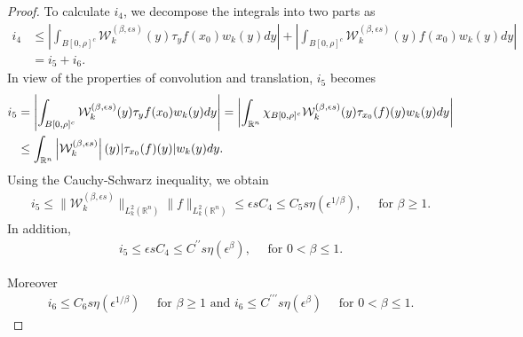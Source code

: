 \documentclass[11pt,a4paper,reqno]{amsproc}
\theoremstyle{definition}
\theoremstyle{remark}
\numberwithin{equation}{section}
\begin{document}
\begin{proof}
To calculate $i_4$, we decompose the integrals into two parts as
\begin{align*}
    i_4 &\leq \left|\int_{B[0,\rho]^c} \mathcal{W}_k^{(\beta, \epsilon s)}(y)  \tau_yf(x_0) w_k(y)dy
        \right| + \left|\int_{B[0,\rho]^c} \mathcal{W}_k^{(\beta, \epsilon s)}(y)  f(x_0) w_k(y)dy 
        \right| \\
        &= i_5+i_6.
\end{align*}
In view of the properties of convolution and translation, $i_5$ becomes
\begin{align*}
    i_5 &= \left|\int_{B[0,\rho]^c} \mathcal{W}_k^{(\beta, \epsilon s)}(y)  \tau_yf(x_0) w_k(y)dy
        \right| = \left| \int_{\mathbb{R}^n} \chi_{B[0,\rho]^c} \mathcal{W}_k^{(\beta, \epsilon s)}(y)\tau_{x_0}( f)(y)w_k(y)dy \right| \notag \\
        & \leq  \int_{\mathbb{R}^n} \left| \mathcal{W}_k^{(\beta, \epsilon s)}\right|(y)|\tau_{x_0}(f)(y)|w_k(y)dy. \notag
\end{align*} 
Using the Cauchy-Schwarz inequality, we obtain  
\begin{align*}
    i_5 \leq  \|\mathcal{W}_k^{(\beta, \epsilon s)}\|_{L_k^2(\mathbb{R}^n)} \|f\|_{L_k^2(\mathbb{R}^n)} \leq \epsilon s C_4 \leq C_5 s\eta(\epsilon^{1/\beta}), \quad \text{ for }  \beta \geq 1. %
\end{align*}
In addition, 
\begin{align*}%
    i_5 \leq \epsilon s C_4 \leq C^{\prime\prime} s\eta(\epsilon^{\beta}), \quad \text{ for } 0< \beta \leq 1.
\end{align*}

\noindent Moreover 
\begin{align*}
    i_6 \leq C_6 s\eta(\epsilon^{1/\beta}) \quad \text{ for $\beta \geq 1$  and } i_6 \leq C^{\prime\prime\prime} s\eta(\epsilon^{\beta}) \quad \text{ for $0<\beta \leq 1$.}
\end{align*}


\end{proof}
\end{document}
